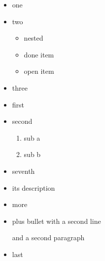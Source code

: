 \documentclass[11pt]{article}
\date{\today}
\title{}
\begin{document}
\tableofcontents

\begin{itemize}
\item one
\item two
\begin{itemize}
\item nested
\item[{$\boxtimes$}] done item
\item[{$\square$}] open item
\end{itemize}
\item three

\item first
\item second
\begin{enumerate}
\item sub a
\item sub b
\end{enumerate}
\setcounter{enumi}{6}
\item seventh

\item[{term}] its description
\item[{another term}] more

\item plus bullet
with a second line

and a second paragraph
\item last
\end{itemize}
\end{document}
